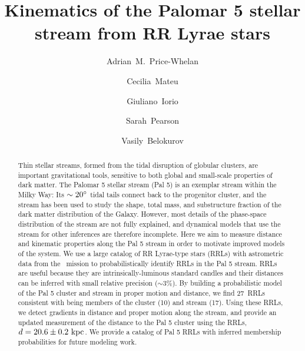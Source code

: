 \documentclass[twocolumn]{aastex63}
\newcommand{\clderr}{\ensuremath{20.6 \pm 0.2~\kpc}}
\newcommand{\NRRL}{27}     %
\newcommand{\NRRcl}{10}     %
\newcommand{\NRRtails}{17} %
\begin{document}
\title{Kinematics of the Palomar 5 stellar stream from RR Lyrae stars}


\author[0000-0003-0872-7098]{Adrian~M.~Price-Whelan}

\author[0000-0002-6330-2394]{Cecilia~Mateu}


\author[0000-0003-0293-503X]{Giuliano~Iorio}

\author[0000-0003-0256-5446]{Sarah~Pearson}

\author[0000-0002-0038-9584]{Vasily~Belokurov}


\begin{abstract}
Thin stellar streams, formed from the tidal disruption of globular clusters, are important gravitational tools, sensitive to both global and small-scale properties of dark matter.
The Palomar 5 stellar stream (Pal 5) is an exemplar stream within the Milky Way: Its $\sim 20\mbox{$^\circ$}$ tidal tails connect back to the progenitor cluster, and the stream has been used to study the shape, total mass, and substructure fraction of the dark matter distribution of the Galaxy.
However, most details of the phase-space distribution of the stream are not fully explained, and dynamical models that use the stream for other inferences are therefore incomplete.
Here we aim to measure distance and kinematic properties along the Pal 5 stream in order to motivate improved models of the system. %
We use a large catalog of RR Lyrae-type stars (RRLs) with astrometric data from the \Gaia\ mission to probabilistically identify RRLs in the Pal 5 stream.
RRLs are useful because they are intrinsically-luminous standard candles and their distances can be inferred with small relative precision ($\sim3\%$).
By building a probabilistic model of the Pal 5 cluster and stream in proper motion and distance, we find \NRRL\ RRLs consistent with being members of the cluster (\NRRcl) and stream (\NRRtails).
Using these RRLs, we detect gradients in distance and proper motion along the stream, and provide an updated measurement of the distance to the Pal 5 cluster using the RRLs, $d = \clderr$.
We provide a catalog of Pal 5 RRLs with inferred membership probabilities for future modeling work.
\end{abstract}
\end{document}
